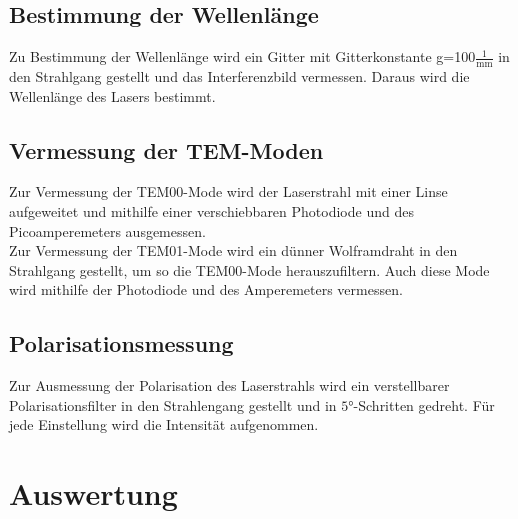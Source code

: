 \documentclass[]{scrartcl}
\begin{document}
\subsection{Bestimmung der Wellenlänge}
Zu Bestimmung der Wellenlänge wird ein Gitter mit Gitterkonstante g=100$\frac{1}{\si{\milli\metre}}$ in den Strahlgang gestellt und das Interferenzbild vermessen. Daraus wird die Wellenlänge des Lasers bestimmt.

\subsection{Vermessung der TEM-Moden}
Zur Vermessung der TEM00-Mode wird der Laserstrahl mit einer Linse aufgeweitet und mithilfe einer verschiebbaren Photodiode und des Picoamperemeters ausgemessen. \\
Zur Vermessung der TEM01-Mode wird ein dünner Wolframdraht in den Strahlgang gestellt, um so die TEM00-Mode herauszufiltern. Auch diese Mode wird mithilfe der Photodiode und des Amperemeters vermessen.

\subsection{Polarisationsmessung}
Zur Ausmessung der Polarisation des Laserstrahls wird ein verstellbarer Polarisationsfilter in den Strahlengang gestellt und in $\ang{5}$-Schritten gedreht. Für jede Einstellung wird die Intensität aufgenommen.

\section{Auswertung}
\end{document}
